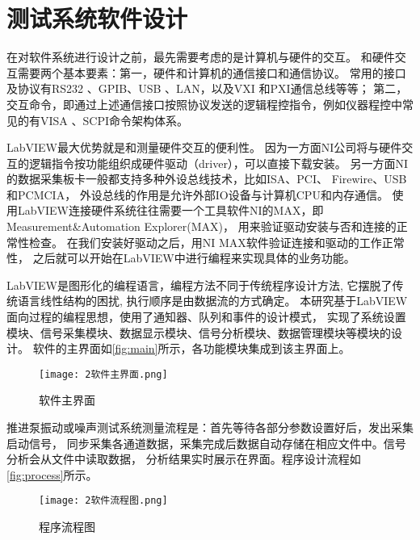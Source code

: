 \section{测试系统软件设计}
在对软件系统进行设计之前，最先需要考虑的是计算机与硬件的交互。
和硬件交互需要两个基本要素：第一，硬件和计算机的通信接口和通信协议。
常用的接口及协议有RS232 、GPIB、USB 、LAN，以及VXI 和PXI通信总线等等；
第二，交互命令，即通过上述通信接口按照协议发送的逻辑程控指令，例如仪器程控中常见的有VISA 、SCPI命令架构体系。

LabVIEW最大优势就是和测量硬件交互的便利性。
因为一方面NI公司将与硬件交互的逻辑指令按功能组织成硬件驱动（driver），可以直接下载安装。
另一方面NI的数据采集板卡一般都支持多种外设总线技术，比如ISA、PCI、 Firewire、USB 和PCMCIA，
外设总线的作用是允许外部IO设备与计算机CPU和内存通信。
使用LabVIEW连接硬件系统往往需要一个工具软件NI的MAX，即Measurement\&Automation Explorer(MAX)，
用来验证驱动安装与否和连接的正常性检查。
在我们安装好驱动之后，用NI MAX软件验证连接和驱动的工作正常性，
之后就可以开始在LabVIEW中进行编程来实现具体的业务功能。

LabVIEW是图形化的编程语言，编程方法不同于传统程序设计方法, 它摆脱了传统语言线性结构的困扰, 
执行顺序是由数据流的方式确定。
本研究基于LabVIEW面向过程的编程思想，使用了通知器、队列和事件的设计模式，
实现了系统设置模块、信号采集模块、数据显示模块、信号分析模块、数据管理模块等模块的设计。
软件的主界面如\autoref{fig:main}所示，各功能模块集成到该主界面上。
\begin{figure}[htbp]
    \centering
    \texttt{[image: 2软件主界面.png]}
    \caption{\label{fig:main}软件主界面}
\end{figure}

推进泵振动或噪声测试系统测量流程是：首先等待各部分参数设置好后，发出采集启动信号，
同步采集各通道数据，采集完成后数据自动存储在相应文件中。信号分析会从文件中读取数据，
分析结果实时展示在界面。程序设计流程如\autoref{fig:process}所示。
\begin{figure}[htbp]
    \centering
    \texttt{[image: 2软件流程图.png]}
    \caption{\label{fig:process}程序流程图}
\end{figure}

\begin{comment}
\subsection{系统设置模块}
软件界面的设置模块提供了测试系统各项参数设定，包括采集通道设置、采样参数设置、
传感器灵敏度设置、分析参数设置等。
\begin{figure}[htbp]
    \centering
    \texttt{[image: 2系统设置.png]}
    \caption{\label{fig:setting}系统设置}
\end{figure}
\end{comment}

